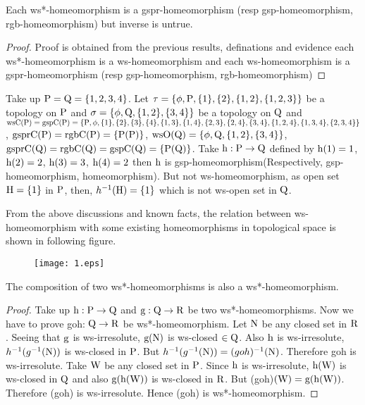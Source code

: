 \begin{thm}\label{thm5.2.20}
Each ws*-homeomorphism is a gspr-homeomorphism (resp gsp-homeomorphism, rgb-homeomorphism) but inverse is untrue.
\end{thm}

\begin{proof}
Proof is obtained from the previous results, definations and evidence each ws*-homeomorphism is a ws-homeomorphism and each ws-homeomorphism is a gspr-homeomorphism (resp gsp-homeomorphism, rgb-homeomorphism)
\end{proof}

\begin{exm}\label{exam5.2.21}
Take up $\mathrm{P}=\mathrm{Q}= \{1, 2, 3, 4\}$. Let $\tau= \{\phi, \TSP, \{1\}, \{2\}, \{1, 2\},\break \{1,2,3\}\}$ be a topology on $\mathrm{P}$ and $\sigma=\{\phi,\mathrm{Q},\{1,2\},\{3,4\}\}$ be a topology on $\mathrm{Q}$ and $\ws\TSC(\TSP)= \gsp\TSC(\TSP)=\{\TSP, \phi,\{1\},\{2\},\{3\},\{4\},\{1,3\},\{1,4\},\{2,3\},\{2,4\},\{3,4\},\break \{1,2,4\},\{1,3,4\},\{2,3,4\}\}$, $\mathrm{gspr}\mathrm{C}(\mathrm{P})=\mathrm{rgb}\mathrm{C}(\mathrm{P})=\{\mathrm{P}(\mathrm{P})\}$, $\ws\TSO(\TSQ)=\{\phi,\TSQ,\{1,2\},\break \{3,4\}\}$, $\mathrm{gspr}\mathrm{C}(\mathrm{Q})=\mathrm{rgb}\mathrm{C}(\mathrm{Q})=\mathrm{gsp}\mathrm{C}(\mathrm{Q})=\{\mathrm{P}(\mathrm{Q})\}$. Take $\mathrm{h}: \mathrm{P}\to \mathrm{Q}$ defined by $\mathrm{h}(1)=1$, $\mathrm{h}(2)= 2$, $\mathrm{h}(3)=3$, $\mathrm{h}(4)=2$ then $\mathrm{h}$ is gsp-homeomorphism(Respectively, gsp-homeomorphism, homeomorphism). But not ws-homeomorphism, as open set $\mathrm{H}= \{1\}$ in $\mathrm{P}$, then, $h^{-1} (\mathrm{H}) = \{1\}$ which is not ws-open set in $\mathrm{Q}$.
\end{exm}

\begin{rem}\label{rem5.2.22} 
From the above discussions and known facts, the relation between ws-homeomorphism with some existing homeomorphisms in topological space is shown in
following figure.
\begin{figure}[!ht]
\centering
\texttt{[image: 1.eps]}
\end{figure}
\end{rem}

\begin{thm}\label{thm5.2.23} 
The composition of two ws*-homeomorphisms is also a ws*-{\break}homeomor\-phism.
\end{thm}

\begin{proof}
Take up $\mathrm{h}: \mathrm{P}\to \mathrm{Q}$ and $\mathrm{g}: \mathrm{Q}\to \mathrm{R}$ be two ws*-homeomorphisms. Now we have to prove goh: $\mathrm{Q}\to \mathrm{R}$ be ws*-homeomorphism. Let $\mathrm{N}$ be any closed set in $\mathrm{R}$. Seeing that $\mathrm{g}$ is ws-irresolute, $\mathrm{g}(\mathrm{N})$ is ws-closed $\in \mathrm{Q}$. Also $\mathrm{h}$ is ws-irresolute, $h^{-1} (g^{-1} (\mathrm{N}))$ is ws-closed in $\mathrm{P}$. But $h^{-1} (g^{-1}(\mathrm{N}))= (goh)^{-1}(\mathrm{N})$. Therefore goh is ws-irresolute. Take $\mathrm{W}$ be any closed set in $\mathrm{P}$. Since $\mathrm{h}$ is ws-irresolute, $\mathrm{h}(\mathrm{W})$ is ws-closed in $\mathrm{Q}$ and also $\mathrm{g}(\mathrm{h}(\mathrm{W}))$ is ws-closed in $\mathrm{R}$. But (goh)$(\mathrm{W})=\mathrm{g}(\mathrm{h}(\mathrm{W}))$. Therefore (goh) is ws-irresolute. Hence (goh) is ws*-homeomorphism.
\end{proof}

